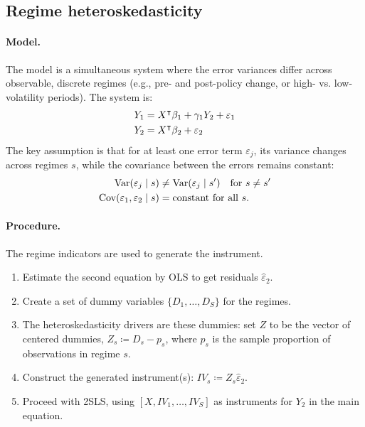 \subsection{Regime heteroskedasticity \textcite{rigobon2003}}

\paragraph{Model.}

The model is a simultaneous system where the error variances differ
across observable, discrete regimes (e.g., pre- and post-policy change,
or high- vs. low-volatility periods). The system is:
\begin{align*}
Y_{1} & =X^{\intercal}\beta_{1}+\gamma_{1}Y_{2}+\varepsilon_{1}\\
Y_{2} & =X^{\intercal}\beta_{2}+\varepsilon_{2}
\end{align*}
The key assumption is that for at least one error term $\varepsilon_{j}$,
its variance changes across regimes $s$, while the covariance between
the errors remains constant:
\begin{align*}
\operatorname{Var}(\varepsilon_{j}\mid s) & \neq\operatorname{Var}(\varepsilon_{j}\mid s')\quad\text{for }s\neq s'\\
\operatorname{Cov}(\varepsilon_{1},\varepsilon_{2}\mid s) & =\text{constant for all }s.
\end{align*}


\paragraph{Procedure.}

The regime indicators are used to generate the instrument.
\begin{enumerate}
\itemsep2pt
\item Estimate the second equation by OLS to get residuals $\hat{\varepsilon}_{2}$.
\item Create a set of dummy variables $\{D_{1},\dots,D_{S}\}$ for the regimes.
\item The heteroskedasticity drivers are these dummies: set $Z$ to be the
vector of centered dummies, $Z_{s}\coloneqq D_{s}-p_{s}$, where $p_{s}$
is the sample proportion of observations in regime $s$.
\item Construct the generated instrument(s): $IV_{s}\coloneqq Z_{s}\hat{\varepsilon}_{2}$.
\item Proceed with 2SLS, using $[X,IV_{1},\dots,IV_{S}]$ as instruments
for $Y_{2}$ in the main equation.
\end{enumerate}

